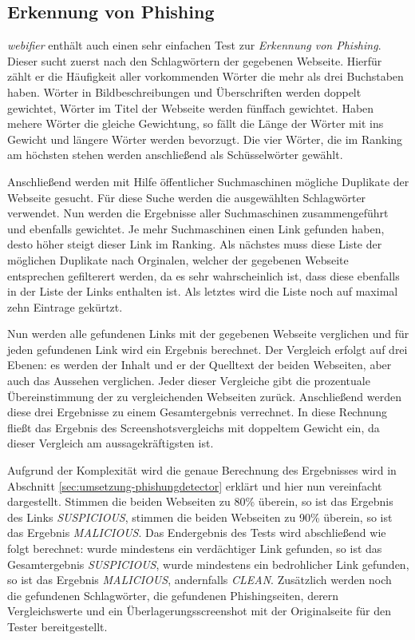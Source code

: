 \subsection{Erkennung von Phishing}

\textit{webifier} enthält auch einen sehr einfachen Test zur \textit{Erkennung von Phishing}. Dieser
sucht zuerst nach den Schlagwörtern der gegebenen Webseite. Hierfür zählt er die Häufigkeit aller
vorkommenden Wörter die mehr als drei Buchstaben haben. Wörter in Bildbeschreibungen und
Überschriften werden doppelt gewichtet, Wörter im Titel der Webseite werden fünffach gewichtet.
Haben mehere Wörter die gleiche Gewichtung, so fällt die Länge der Wörter mit ins Gewicht und
längere Wörter werden bevorzugt. Die vier Wörter, die im Ranking am höchsten stehen werden
anschließend als Schüsselwörter gewählt.

Anschließend werden mit Hilfe öffentlicher Suchmaschinen mögliche Duplikate der Webseite gesucht.
Für diese Suche werden die ausgewählten Schlagwörter verwendet. Nun werden die Ergebnisse aller
Suchmaschinen zusammengeführt und ebenfalls gewichtet. Je mehr Suchmaschinen einen Link gefunden
haben, desto höher steigt dieser Link im Ranking. Als nächstes muss diese Liste der möglichen
Duplikate nach Orginalen, welcher der gegebenen Webseite entsprechen gefilterert werden, da es sehr
wahrscheinlich ist, dass diese ebenfalls in der Liste der Links enthalten ist. Als letztes wird die
Liste noch auf maximal zehn Eintrage gekürtzt.

Nun werden alle gefundenen Links mit der gegebenen Webseite verglichen und für jeden gefundenen Link
wird ein Ergebnis berechnet. Der Vergleich erfolgt auf drei Ebenen: es werden der Inhalt und er der
Quelltext der beiden Webseiten, aber auch das Aussehen verglichen. Jeder dieser Vergleiche gibt die
prozentuale Übereinstimmung der zu vergleichenden Webseiten zurück. Anschließend werden diese drei
Ergebnisse zu einem Gesamtergebnis verrechnet. In diese Rechnung fließt das Ergebnis des
Screenshotsvergleichs mit doppeltem Gewicht ein, da dieser Vergleich am aussagekräftigsten ist.

Aufgrund der Komplexität wird die genaue Berechnung des Ergebnisses wird in Abschnitt \ref{sec:umsetzung-phishungdetector} erklärt und hier nun vereinfacht dargestellt. Stimmen die beiden Webseiten zu 80\% überein, so ist das Ergebnis des Links \textit{SUSPICIOUS}, stimmen die beiden Webseiten zu 90\% überein, so ist das Ergebnis \textit{MALICIOUS}. Das Endergebnis des Tests wird abschließend wie folgt berechnet: wurde mindestens ein verdächtiger Link gefunden, so ist das Gesamtergebnis \textit{SUSPICIOUS}, wurde mindestens ein bedrohlicher Link gefunden, so ist das Ergebnis \textit{MALICIOUS}, andernfalls \textit{CLEAN}. Zusätzlich werden noch die gefundenen Schlagwörter, die gefundenen Phishingseiten, derern Vergleichswerte und ein Überlagerungsscreenshot mit der Originalseite für den Tester bereitgestellt.

